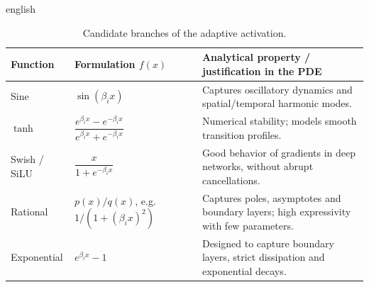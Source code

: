 \documentclass[../0000.tex]{subfiles}
\begin{document}
\begin{hyphenrules}{english}
\begin{table}[htbp]
  \centering
  \caption{Candidate branches of the adaptive activation.}
  \label{tab:abu-branches}
  \small
  \begin{tabularx}{\linewidth}{@{}llX@{}}
    \toprule
    Function & Formulation $f(x)$ & Analytical property / justification in the PDE \\
    \midrule
    Sine & $\sin(\beta_ix)$ & Captures oscillatory dynamics and spatial/temporal harmonic modes. \\
    $\tanh$ & $\dfrac{e^{\beta_ix}-e^{-\beta_ix}}{e^{\beta_ix}+e^{-\beta_ix}}$ & Numerical stability; models smooth transition profiles. \\
    Swish / SiLU & $\dfrac{x}{1+e^{-\beta_ix}}$ & Good behavior of gradients in deep networks, without abrupt cancellations. \\
    Rational & $p(x)/q(x)$, e.g.\ $1/(1+(\beta_ix)^2)$ & Captures poles, asymptotes and boundary layers; high expressivity with few parameters. \\
    Exponential & $e^{\beta_ix}-1$ & Designed to capture boundary layers, strict dissipation and exponential decays. \\
    \bottomrule
  \end{tabularx}
\end{table}

\end{hyphenrules}

\ifSubfilesClassLoaded{}{}
\end{document}
